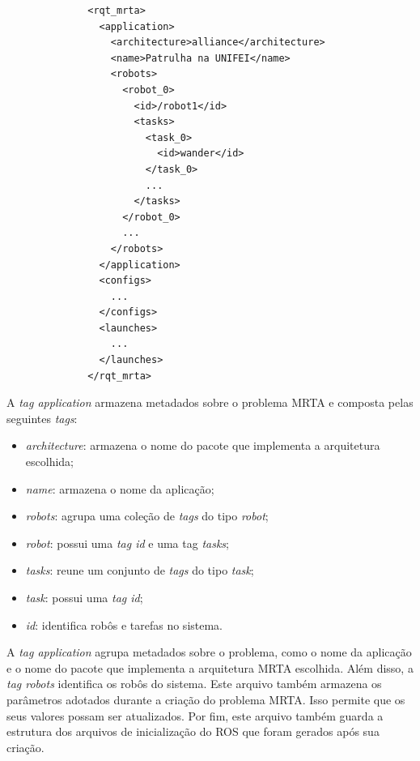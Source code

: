            \begin{lstlisting}
              <rqt_mrta>
                <application>
                  <architecture>alliance</architecture>
                  <name>Patrulha na UNIFEI</name>
                  <robots>
                    <robot_0>
                      <id>/robot1</id>
                      <tasks>
                        <task_0>
                          <id>wander</id>
                        </task_0>
                        ...
                      </tasks>
                    </robot_0>
                    ...
                  </robots>
                </application>
                <configs>
                  ...
                </configs>
                <launches>
                  ...
                </launches>
              </rqt_mrta>
            \end{lstlisting}
        
            A \textit{tag application} armazena metadados sobre o problema MRTA e composta pelas seguintes \textit{tags}:
            
            \begin{itemize}
                \item \textit{architecture}: armazena o nome do pacote que implementa a arquitetura escolhida;
                
                \item \textit{name}: armazena o nome da aplicação;
                
                \item \textit{robots}: agrupa uma coleção de \textit{tags} do tipo \textit{robot};
                
                \item \textit{robot}: possui uma \textit{tag id} e uma tag \textit{tasks};
                
                \item \textit{tasks}: reune um conjunto de \textit{tags} do tipo \textit{task};
                
                \item \textit{task}: possui uma \textit{tag id};
                
                \item \textit{id}: identifica robôs e tarefas no sistema.
            \end{itemize}
            
            A \textit{tag application} agrupa metadados sobre o problema, como o nome da aplicação e o nome do pacote que implementa a arquitetura MRTA escolhida. Além disso, a \textit{tag robots} identifica os robôs do sistema. Este arquivo também armazena os parâmetros adotados durante a criação do problema MRTA. Isso permite que os seus valores possam ser atualizados. Por fim, este arquivo também guarda a estrutura dos arquivos de inicialização do ROS que foram gerados após sua criação. 
        

